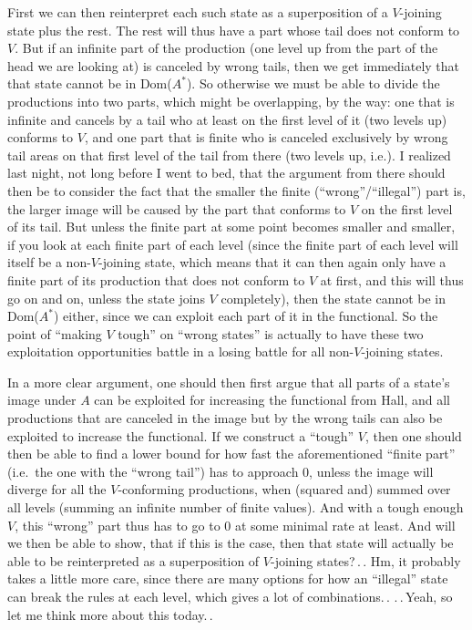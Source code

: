 \documentclass{report}
\begin{document}
First we can then reinterpret each such state as a superposition of a $V$-joining state plus the rest. The rest will thus have a part whose tail does not conform to $V$. But if an infinite part of the production (one level up from the part of the head we are looking at) is canceled by wrong tails, then we get immediately that that state cannot be in Dom($A^*$). So otherwise we must be able to divide the productions into two parts, which might be overlapping, by the way: one that is infinite and cancels by a tail who at least on the first level of it (two levels up) conforms to $V$, and one part that is finite who is canceled exclusively by wrong tail areas on that first level of the tail from there (two levels up, i.e.). I realized last night, not long before I went to bed, that the argument from there should then be to consider the fact that the smaller the finite (``wrong''/``illegal'') part is, the larger image will be caused by the part that conforms to $V$ on the first level of its tail. But unless the finite part at some point becomes smaller and smaller, if you look at each finite part of each level (since the finite part of each level will itself be a non-$V$-joining state, which means that it can then again only have a finite part of its production that does not conform to $V$ at first, and this will thus go on and on, unless the state joins $V$ completely), then the state cannot be in Dom($A^*$) either, since we can exploit each part of it in the functional. So the point of ``making $V$ tough'' on ``wrong states'' is actually to have these two exploitation opportunities battle in a losing battle for all non-$V$-joining states. 

In a more clear argument, one should then first argue that all parts of a state's image under $A$ can be exploited for increasing the functional from Hall, and all productions that are canceled in the image but by the wrong tails can also be exploited to increase the functional. If we construct a ``tough'' $V$, then one should then be able to find a lower bound for how fast the aforementioned ``finite part'' (i.e.\ the one with the ``wrong tail'') has to approach 0, unless the image will diverge for all the $V$-conforming productions, when (squared and) summed over all levels (summing an infinite number of finite values). And with a tough enough $V$, this ``wrong'' part thus has to go to 0 at some minimal rate at least. And will we then be able to show, that if this is the case, then that state will actually be able to be reinterpreted as a superposition of $V$-joining states?\,.\,. Hm, it probably takes a little more care, since there are many options for how an ``illegal'' state can break the rules at each level, which gives a lot of combinations.\,. .\,.\,Yeah, so let me think more about this today.\,. %
\end{document}
